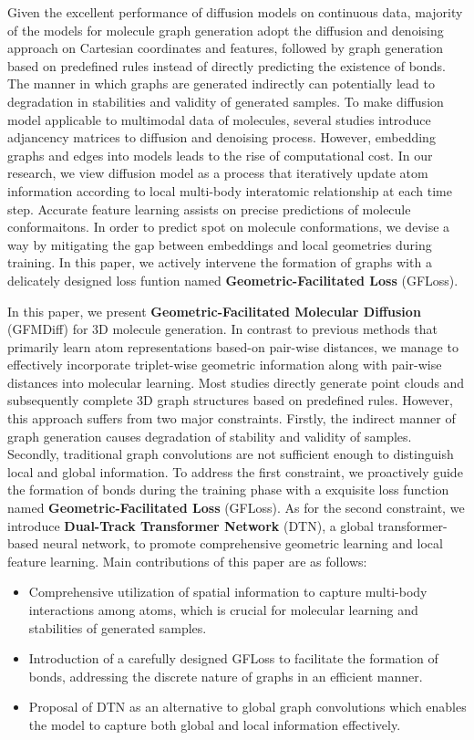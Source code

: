 \documentclass[letterpaper]{article}
\begin{document}
Given the excellent performance of diffusion models on continuous data, majority of the models for molecule graph generation adopt the diffusion and denoising approach on Cartesian coordinates and features, followed by graph generation based on predefined rules instead of directly predicting the existence of bonds. The manner in which graphs are generated indirectly can potentially lead to degradation in stabilities and validity of generated samples. To make diffusion model applicable to multimodal data of molecules, several studies \cite{edpgnn_20_niu,digress_22_vignac,midi_23_vignac} introduce adjancency matrices to diffusion and denoising process. However, embedding graphs and edges into models leads to the rise of computational cost. In our research, we view diffusion model as a process that iteratively update atom information according to local multi-body interatomic relationship at each time step. Accurate feature learning assists on precise predictions of molecule conformaitons. In order to predict spot on molecule conformations, we devise a way by mitigating the gap between embeddings and local geometries during training. In this paper, we actively intervene the formation of graphs with a delicately designed loss funtion named \textbf{Geometric-Facilitated Loss} (GFLoss).


In this paper, we present \textbf{Geometric-Facilitated Molecular Diffusion} (GFMDiff) for 3D molecule generation. In contrast to previous methods that primarily learn atom representations based-on pair-wise distances, we manage to effectively incorporate triplet-wise geometric information along with pair-wise distances into molecular learning. Most studies directly generate point clouds and subsequently complete 3D graph structures based on predefined rules. However, this approach suffers from two major constraints. Firstly, the indirect manner of graph generation causes degradation of stability and validity of samples. Secondly, traditional graph convolutions are not sufficient enough to distinguish local and global information. To address the first constraint, we proactively guide the formation of bonds during the training phase with a exquisite loss function named \textbf{Geometric-Facilitated Loss} (GFLoss). As for the second constraint, we introduce \textbf{Dual-Track Transformer Network} (DTN), a global transformer-based neural network, to promote comprehensive geometric learning and local feature learning. Main contributions of this paper are as follows:
\begin{itemize}
\item Comprehensive utilization of spatial information to capture multi-body interactions among atoms, which is crucial for molecular learning and stabilities of generated samples.
\item Introduction of a carefully designed GFLoss to facilitate the formation of bonds, addressing the discrete nature of graphs in an efficient manner.
\item Proposal of DTN as an alternative to global graph convolutions which enables the model to capture both global and local information effectively.
\end{itemize}
\end{document}
